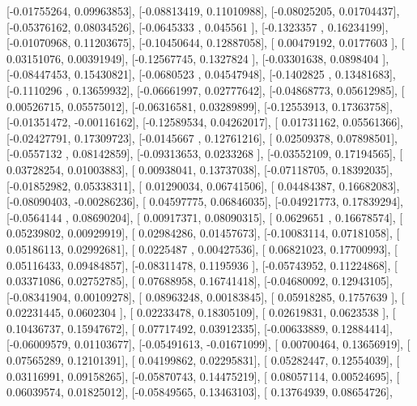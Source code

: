 \documentclass{article}
\begin{document}
       [-0.01755264,  0.09963853],
       [-0.08813419,  0.11010988],
       [-0.08025205,  0.01704437],
       [-0.05376162,  0.08034526],
       [-0.0645333 ,  0.045561  ],
       [-0.1323357 ,  0.16234199],
       [-0.01070968,  0.11203675],
       [-0.10450644,  0.12887058],
       [ 0.00479192,  0.0177603 ],
       [ 0.03151076,  0.00391949],
       [-0.12567745,  0.1327824 ],
       [-0.03301638,  0.0898404 ],
       [-0.08447453,  0.15430821],
       [-0.0680523 ,  0.04547948],
       [-0.1402825 ,  0.13481683],
       [-0.1110296 ,  0.13659932],
       [-0.06661997,  0.02777642],
       [-0.04868773,  0.05612985],
       [ 0.00526715,  0.05575012],
       [-0.06316581,  0.03289899],
       [-0.12553913,  0.17363758],
       [-0.01351472, -0.00116162],
       [-0.12589534,  0.04262017],
       [ 0.01731162,  0.05561366],
       [-0.02427791,  0.17309723],
       [-0.0145667 ,  0.12761216],
       [ 0.02509378,  0.07898501],
       [-0.0557132 ,  0.08142859],
       [-0.09313653,  0.0233268 ],
       [-0.03552109,  0.17194565],
       [ 0.03728254,  0.01003883],
       [ 0.00938041,  0.13737038],
       [-0.07118705,  0.18392035],
       [-0.01852982,  0.05338311],
       [ 0.01290034,  0.06741506],
       [ 0.04484387,  0.16682083],
       [-0.08090403, -0.00286236],
       [ 0.04597775,  0.06846035],
       [-0.04921773,  0.17839294],
       [-0.0564144 ,  0.08690204],
       [ 0.00917371,  0.08090315],
       [ 0.0629651 ,  0.16678574],
       [ 0.05239802,  0.00929919],
       [ 0.02984286,  0.01457673],
       [-0.10083114,  0.07181058],
       [ 0.05186113,  0.02992681],
       [ 0.0225487 ,  0.00427536],
       [ 0.06821023,  0.17700993],
       [ 0.05116433,  0.09484857],
       [-0.08311478,  0.1195936 ],
       [-0.05743952,  0.11224868],
       [ 0.03371086,  0.02752785],
       [ 0.07688958,  0.16741418],
       [-0.04680092,  0.12943105],
       [-0.08341904,  0.00109278],
       [ 0.08963248,  0.00183845],
       [ 0.05918285,  0.1757639 ],
       [ 0.02231445,  0.0602304 ],
       [ 0.02233478,  0.18305109],
       [ 0.02619831,  0.0623538 ],
       [ 0.10436737,  0.15947672],
       [ 0.07717492,  0.03912335],
       [-0.00633889,  0.12884414],
       [-0.06009579,  0.01103677],
       [-0.05491613, -0.01671099],
       [ 0.00700464,  0.13656919],
       [ 0.07565289,  0.12101391],
       [ 0.04199862,  0.02295831],
       [ 0.05282447,  0.12554039],
       [ 0.03116991,  0.09158265],
       [-0.05870743,  0.14475219],
       [ 0.08057114,  0.00524695],
       [ 0.06039574,  0.01825012],
       [-0.05849565,  0.13463103],
       [ 0.13764939,  0.08654726],
\end{document}
